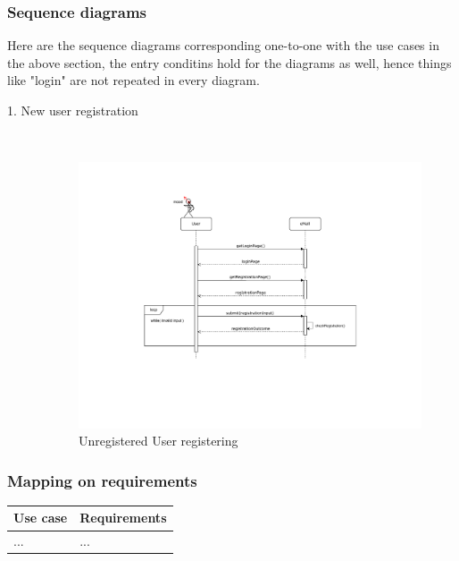\documentclass[11pt]{article}
\begin{document}
\subsubsection{Sequence diagrams}

Here are the sequence diagrams corresponding one-to-one with the use cases in the above section, the entry conditins hold for the diagrams as well, hence things like "login" are not repeated in every diagram.

\begin{description}
    \item [1. New user registration] \hfill \\
    \begin{figure}[H]
        \includegraphics[page={1}, trim=160 170 130 130, width=\linewidth]{SequenceDiagrams.pdf}
        \caption{Unregistered User registering}
    \end{figure}
\end{description}

\subsubsection{Mapping on requirements}

\begin{table}[H]
    \centering
    \setlength{\tabcolsep}{18pt}
    \renewcommand{\arraystretch}{1.2}
    \begin{tabularx}{\textwidth}{|>{\hsize=1.2\hsize}X|>{\hsize=0.8\hsize}X|}
        \hline
        \textbf{Use case} & \textbf{Requirements} \\
        \hline
        ... & ... \\
        \hline
    \end{tabularx}
    \label{tab:useCasesMapping}
\end{table}
\end{document}
